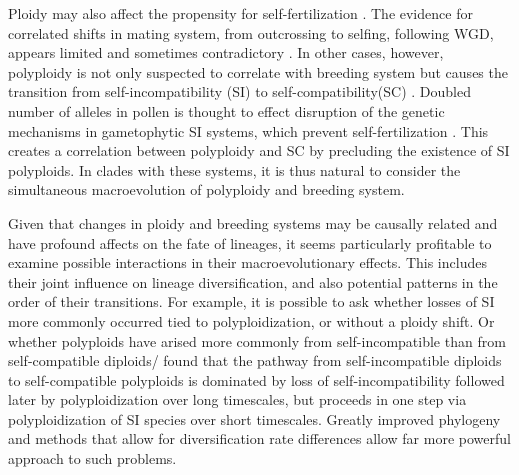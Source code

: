 Ploidy may also affect the propensity for self-fertilization \citep{stebbins1950}. 
The evidence for correlated shifts in mating system, from outcrossing to selfing, following WGD, appears limited and sometimes contradictory \citep{barringer2007, barrett2008, husband2008}.
In other cases, however, polyploidy is not only suspected to correlate with breeding system but causes the transition from self-incompatibility (SI) to self-compatibility(SC) \citep{stout1942, lewis1947}.
Doubled number of alleles in pollen is thought to effect disruption of the genetic mechanisms in gametophytic SI systems, which prevent self-fertilization \citep{entani1999, tsukamoto2005, kubo2010}. 
This creates a correlation between polyploidy and SC by precluding the existence of SI polyploids.
In clades with these systems, it is thus natural to consider the simultaneous macroevolution of polyploidy and breeding system.

Given that changes in ploidy and breeding systems may be causally related and have profound affects on the fate of lineages, it seems particularly profitable to examine possible interactions in their macroevolutionary effects.
This includes their joint influence on lineage diversification, and also potential patterns in the order of their transitions.
For example, it is possible to ask whether losses of  SI more commonly occurred tied to polyploidization, or without a ploidy shift. Or whether polyploids have arised more commonly from self-incompatible than from self-compatible diploids/
 found that the pathway from self-incompatible diploids to self-compatible polyploids is dominated by loss of self-incompatibility followed later by polyploidization over long timescales, but proceeds in one step via polyploidization of SI species over short timescales.
Greatly improved phylogeny and methods that allow for diversification rate differences allow far more powerful approach to such problems. %


